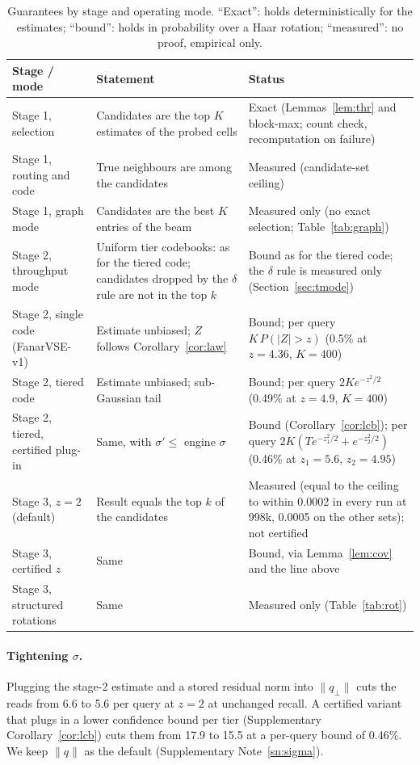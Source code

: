 \documentclass[fleqn,10pt]{wlscirep}
\begin{document}
\begin{table}[!htbp]
\caption{Guarantees by stage and operating mode. ``Exact'': holds deterministically for the estimates; ``bound'': holds in probability over a Haar rotation; ``measured'': no proof, empirical only.}
\label{tab:modes}
\small
\begin{tabular}{p{3.3cm}p{5.2cm}p{6.9cm}}
\toprule
Stage / mode & Statement & Status \\
\midrule
Stage 1, selection & Candidates are the top $K$ estimates of the probed cells & Exact (Lemmas~\ref{lem:thr} and block-max; count check, recomputation on failure) \\
Stage 1, routing and code & True neighbours are among the candidates & Measured (candidate-set ceiling) \\
Stage 1, graph mode & Candidates are the best $K$ entries of the beam & Measured only (no exact selection; Table~\ref{tab:graph}) \\
Stage 2, throughput mode & Uniform tier codebooks: as for the tiered code; candidates dropped by the $\delta$ rule are not in the top $k$ & Bound as for the tiered code; the $\delta$ rule is measured only (Section~\ref{sec:tmode}) \\
Stage 2, single code (FanarVSE-v1) & Estimate unbiased; $Z$ follows Corollary~\ref{cor:law} & Bound; per query $K\,P(|Z|>z)$ (0.5\% at $z=4.36$, $K=400$) \\
Stage 2, tiered code & Estimate unbiased; sub-Gaussian tail & Bound; per query $2K e^{-z^2/2}$ (0.49\% at $z=4.9$, $K=400$) \\
Stage 2, tiered, certified plug-in & Same, with $\sigma'\le$ engine $\sigma$ & Bound (Corollary~\ref{cor:lcb}); per query $2K(Te^{-z_1^2/2}+e^{-z_2^2/2})$ (0.46\% at $z_1=5.6$, $z_2=4.95$) \\
Stage 3, $z=2$ (default) & Result equals the top $k$ of the candidates & Measured (equal to the ceiling to within 0.0002 in every run at 998k, 0.0005 on the other sets); not certified \\
Stage 3, certified $z$ & Same & Bound, via Lemma~\ref{lem:cov} and the line above \\
Stage 3, structured rotations & Same & Measured only (Table~\ref{tab:rot}) \\
\bottomrule
\end{tabular}
\end{table}

\paragraph{Tightening $\sigma$.} Plugging the stage-2 estimate and a stored residual norm into $\|q_\perp\|$ cuts the reads from 6.6 to 5.6 per query at $z=2$ at unchanged recall. A certified variant that plugs in a lower confidence bound per tier (Supplementary Corollary~\ref{cor:lcb}) cuts them from 17.9 to 15.5 at a per-query bound of 0.46\%. We keep $\|q\|$ as the default (Supplementary Note~\ref{sn:sigma}).
\end{document}
